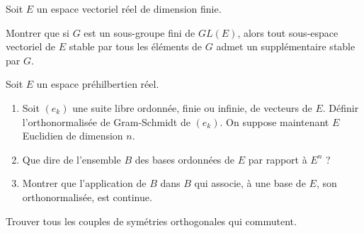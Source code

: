 \begin{exer}
Soit $E$ un espace vectoriel réel de dimension finie.

Montrer que si $G$ est un sous-groupe fini de $GL(E)$, %
alors tout sous-espace vectoriel de $E$ stable par tous les éléments de $G$ admet un suppl\'ementaire stable par $G$.
\end{exer}

\begin{exer}
Soit $E$ un espace préhilbertien réel.
\begin{enumerate}
\item Soit $(e_k)$ une suite libre ordonnée, finie ou infinie, de vecteurs de $E$. Définir l'orthonormalisée de Gram-Schmidt de $(e_k)$.
On suppose maintenant $E$ Euclidien de dimension $n$.
\item Que dire de l'ensemble $B$ des bases ordonnées de $E$ par rapport à $E^n$ ?
\item Montrer que l'application de $B$ dans $B$ qui associe, à une base de $E$, son orthonormalisée, est continue.
\end{enumerate}
\end{exer}

\begin{exer}
Trouver tous les couples de sym\'etries orthogonales qui commutent.
\end{exer}